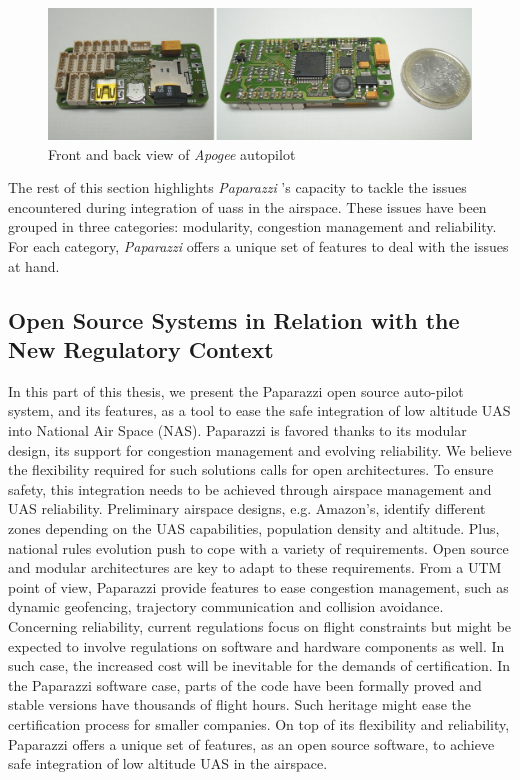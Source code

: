 \begin{figure}
\begin{center}
\includegraphics[width=14cm]{figures/apogeePaparazzi}
\caption{Front and back view of \emph{Apogee} autopilot} 
\label{fig:apogeePaparazzi}
\end{center}
\end{figure}

The rest of this section highlights \emph{Paparazzi} 's capacity to tackle the issues encountered during integration of \gls{uas}s in the airspace. These issues have been grouped in three categories: modularity, congestion management and reliability. For each category, \emph{Paparazzi} offers a unique set of features to deal with the issues at hand.

\subsection{Open Source Systems in Relation with the New Regulatory Context}

In this part of this thesis, we present the Paparazzi open source auto-pilot system, and its features, as a tool to ease the safe integration of low altitude UAS into National Air Space (NAS). 
Paparazzi is favored thanks to its modular design, its support for congestion management and evolving reliability.
We believe the flexibility required for such solutions calls for open architectures. To ensure safety, this integration needs to be achieved through airspace management and UAS reliability.
Preliminary airspace designs, e.g. Amazon's, identify different zones depending on the UAS capabilities, population density and altitude. 
Plus, national rules evolution push to cope with a variety of requirements. Open source and modular architectures are key to adapt to these requirements. 
From a UTM point of view, Paparazzi provide features to ease congestion management, such as dynamic geofencing, trajectory communication and collision avoidance. 
Concerning reliability, current regulations focus on flight constraints but might be expected to involve regulations on software and hardware components as well. 
In such case, the increased cost will be inevitable for the demands of certification. 
In the Paparazzi software case, parts of the code have been formally proved and stable versions have thousands of flight hours. Such heritage might ease the certification process for smaller companies.
On top of its flexibility and reliability, Paparazzi offers a unique set of features, as an open source software, to achieve safe integration of low altitude UAS in the airspace.

